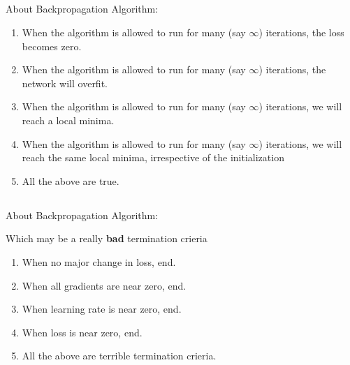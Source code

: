 \begin{frame}
\section{}
About Backpropagation Algorithm:
\begin{enumerate}[label=(\Alph*)]
\item When the algorithm  is allowed to run for many (say $\infty$) iterations, the loss becomes zero.
\item When the algorithm  is allowed to run for many (say $\infty$) iterations, the network will overfit.
\item When the algorithm  is allowed to run for many (say $\infty$) iterations, we will reach a local minima.   %
\item When the algorithm  is allowed to run for many (say $\infty$) iterations, we will reach the same local minima, irrespective of the initialization
\item All the above are true.  %
\end{enumerate}
\end{frame}

\begin{frame}
\section{}
About Backpropagation Algorithm:

Which may be a really {\bf bad} termination crieria
\begin{enumerate}[label=(\Alph*)]
\item When no major change in loss, end.
\item When all gradients are near zero, end.
\item When learning rate is near zero, end.   %
\item When loss is near zero, end.
\item All the above are terrible termination crieria.   %
\end{enumerate}
\end{frame}

